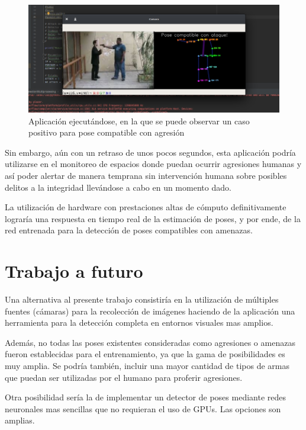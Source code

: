\documentclass[a4paper,12pt,oneside,spanish]{book}
\begin{document}
\begin{figure}[h!]
	\includegraphics[width=450pt]{Imagenes/output1.jpg}
	\centering	
	\caption{Aplicación ejecutándose, en la que se puede observar un caso positivo para pose compatible con agresión}
	\label{fig:output1}
\end{figure}

Sin embargo, aún con un retraso de unos pocos segundos, esta aplicación podría utilizarse en el monitoreo de espacios donde puedan ocurrir agresiones humanas y así poder alertar de manera temprana sin intervención humana sobre posibles delitos a la integridad llevándose a cabo en un momento dado.\par

La utilización de hardware con prestaciones altas de cómputo definitivamente lograría una respuesta en tiempo real de la estimación de poses, y por ende, de la red entrenada para la detección de poses compatibles con amenazas. \par

\section{Trabajo a futuro}
Una alternativa al presente trabajo consistiría en la utilización de múltiples fuentes (cámaras) para la recolección de imágenes haciendo de la aplicación una herramienta para la detección completa en entornos visuales mas amplios.\par

Además, no todas las poses existentes consideradas como agresiones o amenazas fueron establecidas para el entrenamiento, ya que la gama de posibilidades es muy amplia. Se podría también, incluir una mayor cantidad de tipos de armas que puedan ser utilizadas por el humano para proferir agresiones.\par

Otra posibilidad sería la de implementar un detector de poses mediante redes neuronales mas sencillas que no requieran el uso de GPUs. Las opciones son amplias.\par
\end{document}

